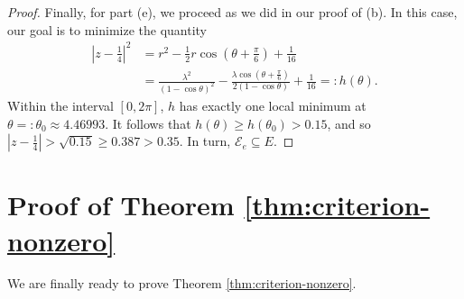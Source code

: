 \documentclass[11pt]{article}
\theoremstyle{definition}
\newcommand{\lm}{\lambda}
\newcommand{\calE}{\mathcal E}
\newcommand{\abs}[1]{\left|#1\right|}
\begin{document}
\begin{proof}
	Finally, for part (e), we proceed as we did in our proof of (b).  In this case, our goal is to minimize the quantity
	\begin{align*}
		\abs{z-\tfrac14}^2 &= r^2 - \frac 12r\cos\left(\theta + \frac\pi 6\right) + \frac 1{16}\\
		&= \frac{\lm^2}{(1-\cos\theta)^2} - \frac{\lm \cos(\theta + \frac\pi 6)}{2(1-\cos\theta)} + \frac 1{16} =: h(\theta).
	\end{align*}
	Within the interval $[0,2\pi]$, $h$ has exactly one local minimum at $\theta =: \theta_0 \approx 4.46993$.  It follows that $h(\theta) \geq h(\theta_0) > 0.15$, and so $|z-\tfrac14| > \sqrt{0.15} \geq 0.387 > 0.35$.  In turn, $\calE_e\subseteq E$.
\end{proof}

\section{Proof of Theorem \ref{thm:criterion-nonzero}}

We are finally ready to prove Theorem \ref{thm:criterion-nonzero}.
\end{document}
